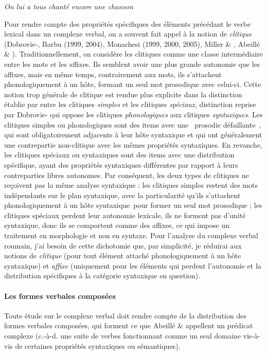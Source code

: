     \textit{On lui a tous chanté encore une chanson}

Pour rendre compte des propriétés spécifiques des éléments précédant le verbe lexical dans un complexe verbal, on a souvent fait appel à la notion de \textit{clitique} (Dobrovie-\citet{Sorin1994}, Barbu (1999, 2004), Monachesi (1999, 2000, 2005), Miller \& \citet{Monachesi2003}, Abeillé \& \citet{Godard2003}). Traditionnellement, on considère les clitiques comme une classe intermédiaire entre les mots et les affixes. Ils semblent avoir une plus grande autonomie que les affixes, mais en même temps, contrairement aux mots, ils s'attachent phonologiquement à un hôte, formant un seul mot prosodique avec celui-ci. Cette notion trop générale de clitique est rendue plus explicite dans la distinction établie par \citet{Zwicky1977} entre les clitiques \textit{simples} et les clitiques \textit{spéciaux}, distinction reprise par Dobrovie-\citet{Sorin1994} qui oppose les clitiques \textit{phonologiques} aux clitiques \textit{syntaxiques}. Les clitiques simples ou phonologiques sont des items avec une {\guillemotleft}~prosodie défaillante~{\guillemotright}, qui sont obligatoirement adjacents à leur hôte syntaxique et qui ont généralement une contrepartie non-clitique avec les mêmes propriétés syntaxiques. En revanche, les clitiques spéciaux ou syntaxiques sont des items avec une distribution spécifique, ayant des propriétés syntaxiques différentes par rapport à leurs contreparties libres autonomes. Par conséquent, les deux types de clitiques ne reçoivent pas la même analyse syntaxique : les clitiques simples restent des mots indépendants sur le plan syntaxique, avec la particularité qu'ils s'attachent phonologiquement à un hôte syntaxique~pour former un seul mot prosodique ; les clitiques spéciaux perdent leur autonomie lexicale, ils ne forment pas d'unité syntaxique, donc ils se comportent comme des affixes, ce qui impose un traitement en morphologie et non en syntaxe. Pour l'analyse du complexe verbal roumain, j'ai besoin de cette dichotomie que, par simplicité, je réduirai aux notions de \textit{clitique} (pour tout élément attaché phonologiquement à un hôte syntaxique) et \textit{affixe} (uniquement pour les éléments qui perdent l'autonomie et la distribution spécifiques à la catégorie syntaxique en question).  

\paragraph[Les formes verbales composées]{Les formes verbales composées}
Toute étude sur le complexe verbal doit rendre compte de la distribution des formes verbales composées, qui forment ce que Abeillé \& \citet{Godard2003} appellent un prédicat complexe (c.-à-d. une suite de verbes fonctionnant comme un seul domaine vis-à-vis de certaines propriétés syntaxiques ou sémantiques).

